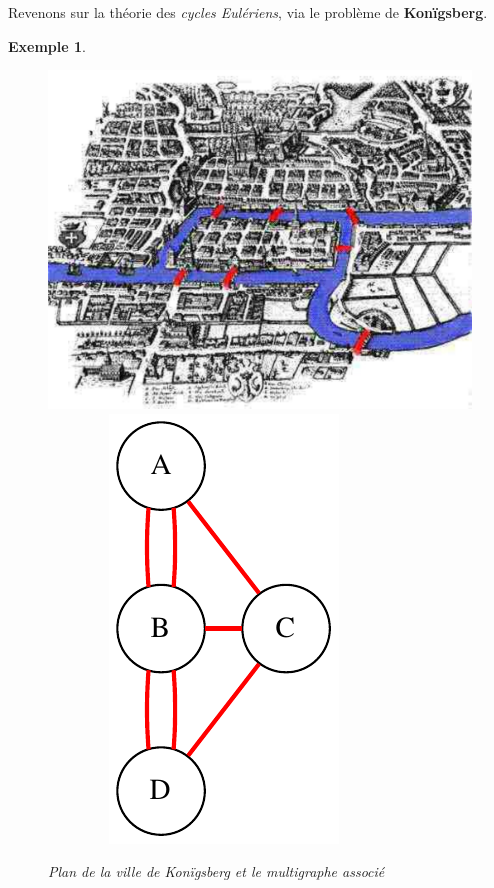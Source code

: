 \documentclass{article}
\newtheorem{exemple}{Exemple}[section]
\begin{document}
\begin{sffamily}
\newpage

Revenons sur la théorie des \textit{cycles Eulériens}, via le problème de \textbf{Konïgsberg}.
\begin{exemple}$ $ \\
\begin{figure}[h!]
    \begin{center}
    \includegraphics[scale=0.4]{konigsberg.pdf}$\qquad\qquad$
    \includegraphics[scale=0.5]{konig.pdf}
    \caption{Plan de la ville de Konïgsberg et le multigraphe associé}
    \end{center}
\end{figure}


\end{exemple}
\end{sffamily}
\end{document}
